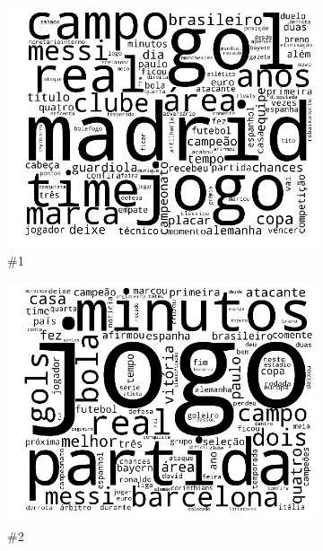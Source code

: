 \documentclass[
    12pt,                %
    oneside,            %
    a4paper,            %
    english,            %
    brazil                %
    ]{abntex2ppgsi}
\begin{document}
\begin{figure}[H]
\centering
    \begin{subfigure}[b]{0.15\textwidth}
        \includegraphics[width=\textwidth]{img/ovnmtf-nc-3-tc-1.png}
        \caption{\#1}
    \end{subfigure}
    \begin{subfigure}[b]{0.15\textwidth}
        \includegraphics[width=\textwidth]{img/ovnmtf-nc-3-tc-2.png}
        \caption{\#2}
    \end{subfigure}
    \begin{subfigure}[b]{0.15\textwidth}

\end{subfigure}
\end{figure}
\end{document}
